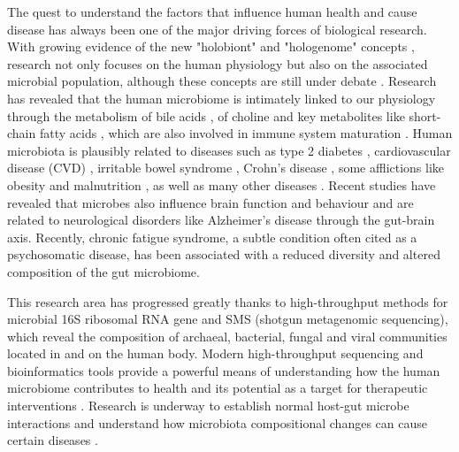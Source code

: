 The quest to understand the factors that influence human health and cause disease has always been one of the major driving forces of biological research. With growing evidence of the new "holobiont"  and "hologenome" concepts \cite{holo1, holo2}, research not only focuses on the human physiology but also on the associated microbial population, although these concepts are still under debate \cite{holo3}. Research has revealed that the human microbiome is intimately linked to our physiology through the metabolism of bile acids \cite{bileacids}, of choline \cite{choline} and key metabolites like short-chain fatty acids \cite{scfa1, scfa2}, which are also involved in immune system maturation \cite{scfa3, scfa4}. Human microbiota is plausibly related to diseases such as type 2 diabetes \cite{diabetes2}, cardiovascular disease (CVD) \cite{CVD}, irritable bowel syndrome \cite{IBS}, Crohn's disease \cite{CD}, some afflictions like obesity \cite{ob1, ob2} and malnutrition \cite{nutr}, as well as many other diseases \cite{Moya_trends}. Recent studies have revealed that microbes also influence brain function and behaviour and are related to neurological disorders like Alzheimer's disease through the gut-brain axis\cite{mind,AD}. Recently, chronic fatigue syndrome, a subtle condition often cited as a psychosomatic disease, has been associated with a reduced diversity and altered composition of the gut microbiome\cite{CFS}.

This research area has progressed greatly thanks to high-throughput methods for microbial 16S ribosomal RNA gene and SMS (shotgun metagenomic sequencing), which reveal the composition of archaeal, bacterial, fungal and viral communities located in and on the human body. Modern high-throughput sequencing and bioinformatics tools provide a powerful means of understanding how the human microbiome contributes to health and its potential as a target for therapeutic interventions \cite{microb&health}. Research is underway to establish normal host-gut microbe interactions and understand how microbiota compositional changes can cause certain diseases  \cite{normal1, normal2, panthropology}.

